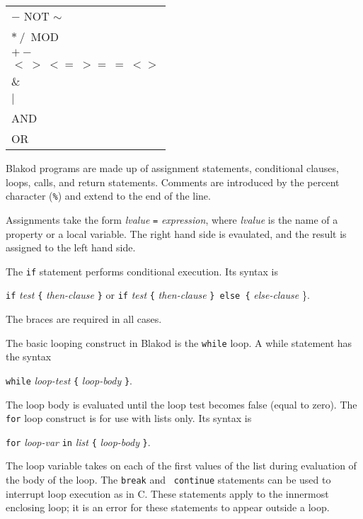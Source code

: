 \begin{center}
\begin{tabular}{|l|}
\hline
$-$ NOT $\sim$ \\
$*\ /$\ MOD \\
$+ -$ \\
$<\  >\ <=\ >=\ =\ <>$ \\
\& \\
$\mid$ \\
AND \\ 
OR \\
\hline
\end{tabular}
\end{center}


Blakod programs are made up of assignment statements, conditional
clauses, loops, calls, and return statements.  Comments are introduced
by the percent character ({\tt \%}) and extend to the end of the
line.

Assignments take the form {\em lvalue} {\tt =} {\em expression}, where
{\em lvalue} is the name of a property or a local variable.  The right
hand side is evaulated, and the result is assigned to the left hand
side.

The {\tt if} statement performs conditional execution.  Its syntax is
\begin{center}
{\tt if} {\em test} {\tt \{} {\em then-clause} {\tt \}} or
\linebreak
{\tt if} {\em test} {\tt \{} {\em then-clause} {\tt \} else \{} {\em
else-clause} {\}}.
\end{center}
The braces are required in all cases.

The basic looping construct in Blakod is the {\tt while} loop.  A while
statement has the syntax 
\begin{center}
{\tt while} {\em loop-test} {\tt \{} {\em loop-body} {\tt \}}.
\end{center}
The loop body is evaluated until the loop test becomes false (equal to
zero).  The {\tt for} loop construct is for use with lists only.  Its
syntax is
\begin{center}
{\tt for} {\em loop-var} {\tt in} {\em list} {\tt \{} {\em loop-body} {\tt \}}.
\end{center}
The loop variable takes on each of the first values of the list during
evaluation of the body of the loop.  The {\tt break} and {\tt
continue} statements can be used to interrupt loop execution as in C.
These statements apply to the innermost enclosing loop; it is an error
for these statements to appear outside a loop.

